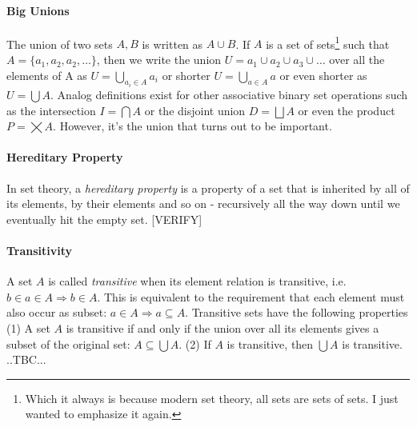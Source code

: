 
\paragraph{Big Unions}
The union of two sets $A,B$ is written as $A \cup B$. If $A$ is a set of sets\footnote{Which it always is because modern set theory, all sets are sets of sets. I just wanted to emphasize it again.} such that $A = \{a_1, a_2, a_2, \ldots \}$, then we write the union $U = a_1 \cup a_2 \cup a_3 \cup \ldots$ over all the elements of A as $U = \bigcup_{a_i \in A} a_i$ or shorter $U = \bigcup_{a \in A} a$ or even shorter as $U = \bigcup A$. Analog definitions exist for other associative binary set operations such as the intersection $I = \bigcap A$ or the disjoint union $D = \bigsqcup A$ or even the product $P = \bigtimes A$. However, it's the union that turns out to be important. 

\paragraph{Hereditary Property}
In set theory, a \emph{hereditary property} is a property of a set that is inherited by all of its elements, by their elements and so on - recursively all the way down until we eventually hit the empty set. [VERIFY]







\paragraph{Transitivity}
A set $A$ is called \emph{transitive} when its element relation is transitive, i.e. $b \in a \in A \Rightarrow b \in A$. This is equivalent to the requirement that each element must also occur as subset: $a \in A \Rightarrow a \subseteq A$. Transitive sets have the following properties (1) A set $A$ is transitive if and only if the union over all its elements gives a subset of the original set: $A \subseteq \bigcup A$. (2) If $A$ is transitive, then $\bigcup A$ is transitive. ..TBC...

